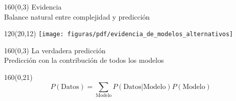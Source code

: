 \documentclass[shownotes,aspectratio=169]{beamer}
\begin{document}
\begin{frame}[plain]
\begin{textblock}{160}(0,3)
\centering \LARGE  Evidencia \\
\large Balance natural entre complejidad y predicci\'on
\end{textblock}


 \begin{textblock}{120}(20,12)
  \centering
  \texttt{[image: figuras/pdf/evidencia\_de\_modelos\_alternativos]}
 \end{textblock}

  \end{frame}



\begin{frame}[plain]
\begin{textblock}{160}(0,3)
\centering \LARGE  La verdadera predicción \\
\large Predicción con la contribución de todos los modelos
\end{textblock}


\begin{textblock}{160}(0,21)
\begin{equation*}
P(\text{Datos}) =  \sum_{\text{Modelo}} P(\text{Datos}|\text{Modelo}) P(\text{Modelo})
\end{equation*}
\end{textblock}

%



\end{frame}
\end{document}
